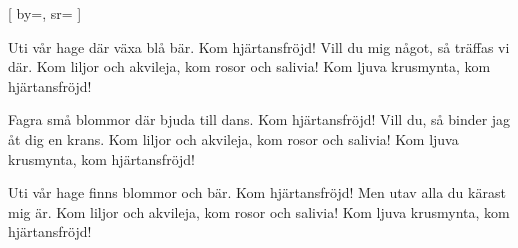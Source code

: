 

[ 			%
	by={},			%
	sr={}			%
]				%
	
\beginverse*
Uti vår hage där växa blå bär.
Kom hjärtansfröjd!
Vill du mig något, så träffas vi där.
Kom liljor och akvileja, kom rosor och salivia!
Kom ljuva krusmynta, kom hjärtansfröjd!
\endverse

\beginverse*
Fagra små blommor där bjuda till dans.
Kom hjärtansfröjd!
Vill du, så binder jag åt dig en krans.
Kom liljor och akvileja, kom rosor och salivia!
Kom ljuva krusmynta, kom hjärtansfröjd!
\endverse

\beginverse*
Uti vår hage finns blommor och bär.
Kom hjärtansfröjd!
Men utav alla du kärast mig är.
Kom liljor och akvileja, kom rosor och salivia!
Kom ljuva krusmynta, kom hjärtansfröjd!
\endverse

\endsong							%